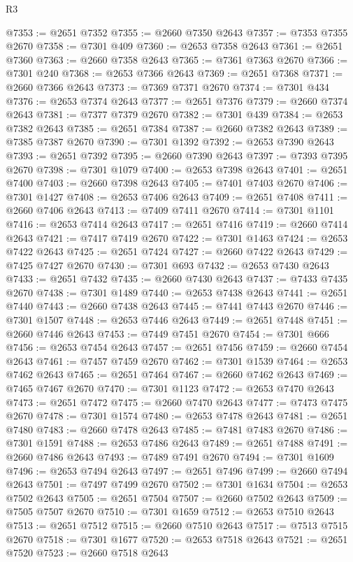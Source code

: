 \begin{lexlean}{R3}
\begin{coremodule}
@7353 := @2651 @7352
@7355 := @2660 @7350 @2643
@7357 := @7353 @7355 @2670
@7358 := @7301 @409
@7360 := @2653 @7358 @2643
@7361 := @2651 @7360
@7363 := @2660 @7358 @2643
@7365 := @7361 @7363 @2670
@7366 := @7301 @240
@7368 := @2653 @7366 @2643
@7369 := @2651 @7368
@7371 := @2660 @7366 @2643
@7373 := @7369 @7371 @2670
@7374 := @7301 @434
@7376 := @2653 @7374 @2643
@7377 := @2651 @7376
@7379 := @2660 @7374 @2643
@7381 := @7377 @7379 @2670
@7382 := @7301 @439
@7384 := @2653 @7382 @2643
@7385 := @2651 @7384
@7387 := @2660 @7382 @2643
@7389 := @7385 @7387 @2670
@7390 := @7301 @1392
@7392 := @2653 @7390 @2643
@7393 := @2651 @7392
@7395 := @2660 @7390 @2643
@7397 := @7393 @7395 @2670
@7398 := @7301 @1079
@7400 := @2653 @7398 @2643
@7401 := @2651 @7400
@7403 := @2660 @7398 @2643
@7405 := @7401 @7403 @2670
@7406 := @7301 @1427
@7408 := @2653 @7406 @2643
@7409 := @2651 @7408
@7411 := @2660 @7406 @2643
@7413 := @7409 @7411 @2670
@7414 := @7301 @1101
@7416 := @2653 @7414 @2643
@7417 := @2651 @7416
@7419 := @2660 @7414 @2643
@7421 := @7417 @7419 @2670
@7422 := @7301 @1463
@7424 := @2653 @7422 @2643
@7425 := @2651 @7424
@7427 := @2660 @7422 @2643
@7429 := @7425 @7427 @2670
@7430 := @7301 @693
@7432 := @2653 @7430 @2643
@7433 := @2651 @7432
@7435 := @2660 @7430 @2643
@7437 := @7433 @7435 @2670
@7438 := @7301 @1489
@7440 := @2653 @7438 @2643
@7441 := @2651 @7440
@7443 := @2660 @7438 @2643
@7445 := @7441 @7443 @2670
@7446 := @7301 @1507
@7448 := @2653 @7446 @2643
@7449 := @2651 @7448
@7451 := @2660 @7446 @2643
@7453 := @7449 @7451 @2670
@7454 := @7301 @666
@7456 := @2653 @7454 @2643
@7457 := @2651 @7456
@7459 := @2660 @7454 @2643
@7461 := @7457 @7459 @2670
@7462 := @7301 @1539
@7464 := @2653 @7462 @2643
@7465 := @2651 @7464
@7467 := @2660 @7462 @2643
@7469 := @7465 @7467 @2670
@7470 := @7301 @1123
@7472 := @2653 @7470 @2643
@7473 := @2651 @7472
@7475 := @2660 @7470 @2643
@7477 := @7473 @7475 @2670
@7478 := @7301 @1574
@7480 := @2653 @7478 @2643
@7481 := @2651 @7480
@7483 := @2660 @7478 @2643
@7485 := @7481 @7483 @2670
@7486 := @7301 @1591
@7488 := @2653 @7486 @2643
@7489 := @2651 @7488
@7491 := @2660 @7486 @2643
@7493 := @7489 @7491 @2670
@7494 := @7301 @1609
@7496 := @2653 @7494 @2643
@7497 := @2651 @7496
@7499 := @2660 @7494 @2643
@7501 := @7497 @7499 @2670
@7502 := @7301 @1634
@7504 := @2653 @7502 @2643
@7505 := @2651 @7504
@7507 := @2660 @7502 @2643
@7509 := @7505 @7507 @2670
@7510 := @7301 @1659
@7512 := @2653 @7510 @2643
@7513 := @2651 @7512
@7515 := @2660 @7510 @2643
@7517 := @7513 @7515 @2670
@7518 := @7301 @1677
@7520 := @2653 @7518 @2643
@7521 := @2651 @7520
@7523 := @2660 @7518 @2643

\end{coremodule}
\end{lexlean}
